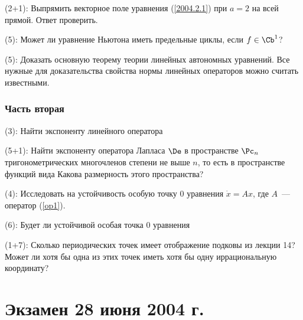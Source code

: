 \documentclass[a4paper]{article}
\newcommand{\skill}[1]{\textsf{(#1):}}
\begin{document}
\begin{problem}
\skill{2+1}
Выпрямить векторное поле уравнения (\ref{2004.2.1}) при $a = 2$ на всей прямой. Ответ проверить.
\end{problem}

\begin{problem}
\skill{5}
Может ли уравнение Ньютона
иметь предельные циклы, если $f \in \Cb^1$?
\end{problem}

\begin{problem}
\skill{5}
Доказать основную теорему теории линейных автономных уравнений. Все нужные
для доказательства свойства нормы линейных операторов можно считать известными.
\end{problem}

\subsubsection{Часть вторая}

\begin{problem}

 \skill{3} Найти экспоненту линейного оператора

 \skill{5+1} Найти экспоненту оператора Лапласа $\De$ в пространстве $\Pc_n$ тригонометрических многочленов
степени не выше $n$, то есть в пространстве функций вида
Какова размерность этого пространства?
\end{problem}

\begin{problem}

 \skill{4} Исследовать на устойчивость особую точку $0$ уравнения $\dot x = Ax$, где $A$~---
оператор (\ref{op1}).

 \skill{6} Будет ли устойчивой особая точка $0$ уравнения
\end{problem}

\begin{problem}
\skill{1+7} Сколько периодических точек имеет отображение подковы из лекции 14? Может ли хотя бы одна из этих точек
иметь хотя бы одну иррациональную координату?
\end{problem}

\section{Экзамен 28 июня 2004 г.}
\end{document}
